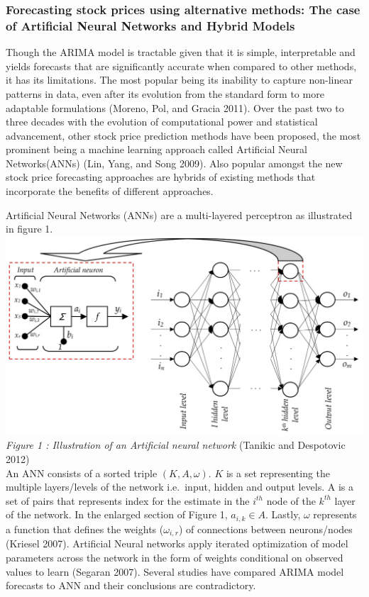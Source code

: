 \documentclass[12pt,a4paper]{article}
\numberwithin{equation}{section}
\numberwithin{figure}{section}
\numberwithin{table}{section}
\begin{document}
\subsubsection{Forecasting stock prices using alternative methods: The
case of Artificial Neural Networks and Hybrid
Models}\label{forecasting-stock-prices-using-alternative-methods-the-case-of-artificial-neural-networks-and-hybrid-models}

Though the ARIMA model is tractable given that it is simple,
interpretable and yields forecasts that are significantly accurate when
compared to other methods, it has its limitations. The most popular
being its inability to capture non-linear patterns in data, even after
its evolution from the standard form to more adaptable formulations
(Moreno, Pol, and Gracia 2011). Over the past two to three decades with
the evolution of computational power and statistical advancement, other
stock price prediction methods have been proposed, the most prominent
being a machine learning approach called Artificial Neural
Networks(ANNs) (Lin, Yang, and Song 2009). Also popular amongst the new
stock price forecasting approaches are hybrids of existing methods that
incorporate the benefits of different approaches.

Artificial Neural Networks (ANNs) are a multi-layered perceptron as
illustrated in figure 1.\\
\includegraphics{ANN.png}\\
\emph{Figure 1 : Illustration of an Artificial neural network} (Tanikic
and Despotovic 2012)\\
An ANN consists of a sorted triple \((K, A, \omega)\). \(K\) is a set
representing the multiple layers/levels of the network i.e.~input,
hidden and output levels. A is a set of pairs that represents index for
the estimate in the \(i^{th}\) node of the \(k^{th}\) layer of the
network. In the enlarged section of Figure 1, \(a_{i,k} \in A\). Lastly,
\(\omega\) represents a function that defines the weights
(\(\omega_{i,r}\)) of connections between neurons/nodes (Kriesel 2007).
Artificial Neural networks apply iterated optimization of model
parameters across the network in the form of weights conditional on
observed values to learn (Segaran 2007). Several studies have compared
ARIMA model forecasts to ANN and their conclusions are contradictory.
\end{document}
